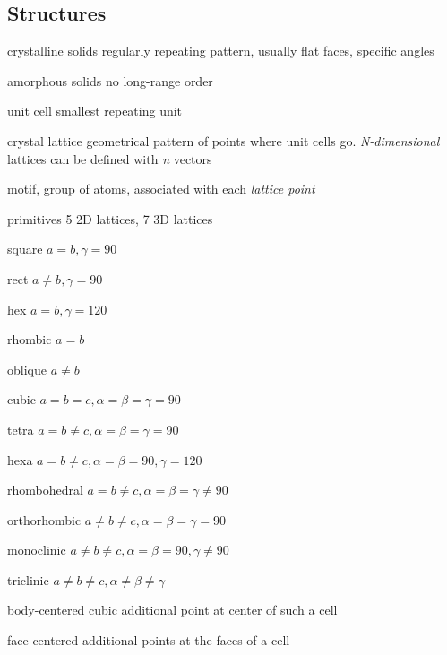 \begin{mdframed}
    \subsection{Structures}

    \begin{multicols}{3}
\begin{compactdesc}
        \item[crystalline solids] regularly repeating pattern, usually flat
            faces, specific angles
        \item[amorphous solids] no long-range order
        \item[unit cell] smallest repeating unit
        \item[crystal lattice] geometrical pattern of points where unit cells go.
            \emph{N-dimensional} lattices
            can be defined with \emph{n} vectors
        \item[motif,]group of atoms, associated with each \emph{lattice point}
        \item[primitives] 5 2D lattices, 7 3D lattices
        \item[square  ] $a = b, \gamma = 90$
        \item[rect    ] $a \neq b, \gamma = 90$
        \item[hex     ] $a = b, \gamma = 120$
        \item[rhombic ] $a = b$
        \item[oblique ] $a \neq b$
        \item[cubic] $a = b = c, \alpha = \beta = \gamma = 90$
        \item[tetra] $a = b \neq c, \alpha = \beta = \gamma = 90$
        \item[hexa] $a = b \neq c, \alpha = \beta = 90, \gamma = 120$
        \item[rhombohedral] $a = b \neq c, \alpha = \beta = \gamma \neq 90$
        \item[orthorhombic] $a \neq b \neq c, \alpha = \beta = \gamma = 90$
        \item[monoclinic] $a \neq b \neq c, \alpha = \beta = 90, \gamma \neq 90$
        \item[triclinic] $a \neq b \neq c, \alpha \neq \beta \neq \gamma$
        \item[body-centered cubic] additional point at center of such a cell
        \item[face-centered] additional points at the faces of a cell
    \end{compactdesc}
\end{multicols}
\end{mdframed}

